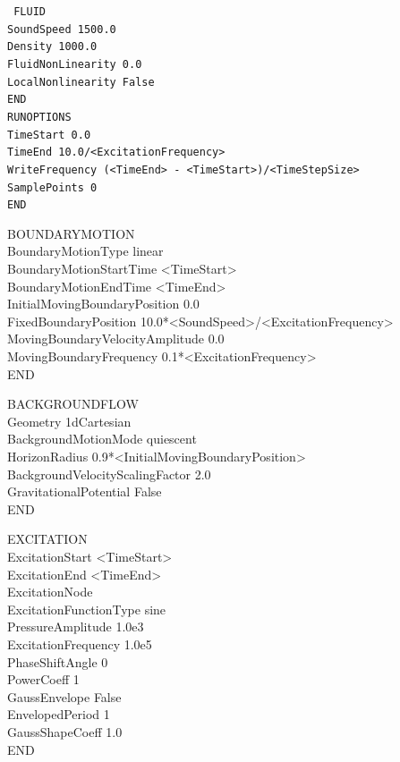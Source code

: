 {\tt
FLUID \\
SoundSpeed 1500.0 \\
Density 1000.0 \\
FluidNonLinearity 0.0 \\
LocalNonlinearity False \\
END \\

RUNOPTIONS \\
TimeStart 0.0 \\
TimeEnd 10.0/<ExcitationFrequency> \\
WriteFrequency (<TimeEnd> - <TimeStart>)/<TimeStepSize> \\
SamplePoints 0 \\
END

BOUNDARYMOTION \\
BoundaryMotionType linear \\
BoundaryMotionStartTime <TimeStart> \\
BoundaryMotionEndTime <TimeEnd> \\
InitialMovingBoundaryPosition 0.0 \\
FixedBoundaryPosition 10.0*<SoundSpeed>/<ExcitationFrequency> \\
MovingBoundaryVelocityAmplitude 0.0 \\
MovingBoundaryFrequency 0.1*<ExcitationFrequency> \\
END

BACKGROUNDFLOW \\
Geometry 1dCartesian \\
BackgroundMotionMode quiescent \\
HorizonRadius 0.9*<InitialMovingBoundaryPosition> \\
BackgroundVelocityScalingFactor 2.0 \\
GravitationalPotential False \\
END

EXCITATION \\
ExcitationStart <TimeStart> \\
ExcitationEnd <TimeEnd> \\
ExcitationNode  \\
ExcitationFunctionType sine \\
PressureAmplitude 1.0e3 \\
ExcitationFrequency 1.0e5 \\
PhaseShiftAngle 0 \\
PowerCoeff 1 \\
GaussEnvelope False \\
EnvelopedPeriod 1 \\
GaussShapeCoeff 1.0 \\
END

}
